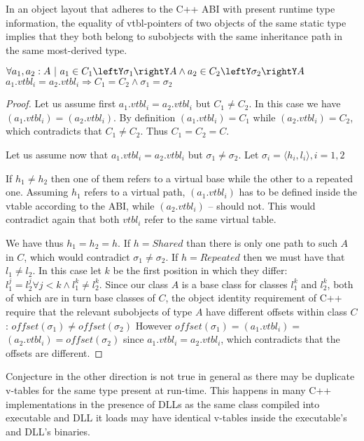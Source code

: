 \begin{theorem}
In an object layout that adheres to the C++ ABI with present runtime type 
information, the equality of vtbl-pointers of two objects of the same 
static type implies that they both belong to subobjects with the same 
inheritance path in the same most-derived type.

\noindent
$\forall a_1, a_2 : A\ |\ a_1\in C_1\leftY\sigma_1\rightY A \wedge a_2\in C_2\leftY\sigma_2\rightY A $ \\ 
$a_1.vtbl_i = a_2.vtbl_i \Rightarrow C_1 = C_2 \wedge \sigma_1 = \sigma_2$
\label{thm:vtbl}
\end{theorem}
\begin{proof}
Let us assume first $a_1.vtbl_i = a_2.vtbl_i$ but $C_1 \neq C_2$. In this case we 
have $(a_1.vtbl_i) = $$(a_2.vtbl_i)$. By definition 
$(a_1.vtbl_i) = C_1$ while $(a_2.vtbl_i) = C_2$, which 
contradicts that $C_1 \neq C_2$. Thus $C_1 = C_2 = C$.

Let us assume now that $a_1.vtbl_i = a_2.vtbl_i$ but $\sigma_1 \neq \sigma_2$. 
Let $\sigma_i=\langle h_i,l_i\rangle,i=1,2$ 

If $h_1 \neq h_2$ then one of them refers to a virtual base while the other to a 
repeated one. Assuming $h_1$ refers to a virtual path, $(a_1.vtbl_i)$ 
has to be defined inside the vtable according to the ABI, while 
$(a_2.vtbl_i)$ -- should not. This would contradict again that both 
$vtbl_i$ refer to the same virtual table.

We have thus $h_1 = h_2 = h$. If $h = Shared$ than there is only one path to 
such $A$ in $C$, which would contradict $\sigma_1 \neq \sigma_2$. 
If $h = Repeated$ then we must have that $l_1 \neq l_2$. In this case let $k$ be 
the first position in which they differ: 
$l_1^j=l_2^j \forall j<k \wedge l_1^k\neq l_2^k$. Since our class $A$ is a base 
class for classes $l_1^k$ and $l_2^k$, both of which are in turn base classes of 
$C$, the object identity requirement of C++ require that the relevant subobjects 
of type $A$ have different offsets within class $C$: 
$offset(\sigma_1)\neq offset(\sigma_2)$ However 
$offset(\sigma_1)=$$(a_1.vtbl_i)=$$(a_2.vtbl_i)=offset(\sigma_2)$ 
since $a_1.vtbl_i = a_2.vtbl_i$, which contradicts that the offsets are different.
\end{proof}

\noindent
Conjecture in the other direction is not true in general as there may be 
duplicate v-tables for the same type present at run-time. This happens in 
many C++ implementations in the presence of DLLs as the same class compiled into 
executable and DLL it loads may have identical v-tables inside the 
executable's and DLL's binaries.

